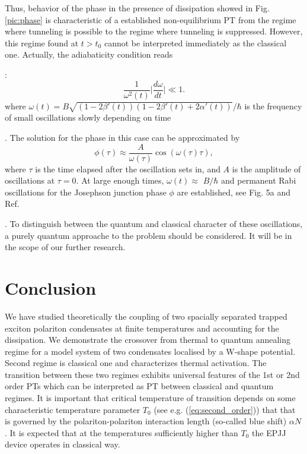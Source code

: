 \documentclass[aps, pre, preprint, groupedaddress, superscriptaddress, showkeys, showpacs] {revtex4-1}
\begin{document}
Thus, behavior of the phase in the presence of dissipation showed in Fig. \ref{pic:phase} is characteristic of a established non-equilibrium PT from the regime where tunneling is possible to the regime where tunneling is suppressed.
However, this regime found at $t>t_0$ cannot be interpreted immediately as the classical one.
Actually, the adiabaticity condition reads {\cite{Sols}:
%
\begin{equation}
\dfrac{1}{\omega^2(t)} \Big| \dfrac{d \omega}{d t} \Big| \ll 1.
\end{equation}
%
where $\omega(t) = B \sqrt{(1 - 2 \beta'(t))(1 - 2 \beta'(t) + 2 \alpha'(t))}/ \hbar $ is the frequency of small oscillations slowly depending on time {\cite{Sedov}. 
The solution for the phase in this case can be approximated by 
\begin{equation}
\phi(\tau) \approx \dfrac{A}{\omega(\tau)} \cos (\omega(\tau) \tau),
\end{equation}
%
where $\tau$ is the time elapsed after the oscillation sets in, and $A$ is the amplitude of oscillations at $\tau = 0$.
At large enough times, $\omega(t) \approx$ $B/ \hbar$ and permanent Rabi  oscillations for the Josephson junction phase $\phi$ are established, see Fig. 5a and Ref. {\cite{Permamemt}.
To distinguish between the quantum and classical character of these oscillations, a purely quantum approache to the problem should be considered.      
It will be in the scope of our further research.

\section{Conclusion \label{sec:conclusion}}

We have studied theoretically the coupling of two spacially separated trapped exciton polariton condensates at finite temperatures and accounting for the dissipation.
We demonstrate the crossover from thermal to quantum annealing regime for a model system of two condensates localised by a W-shape potential.
Second regime is classical one and characterizes  thermal activation.
The transition between these two regimes exhibits universal features of the 1st or 2nd order PTs which can be interpreted as PT between classical and quantum regimes. It is important that critical temperature of transition depends on some  characteristic temperature  parameter $T_{0}$ (see e.g. (\ref{eq:second_order})) that that is governed by the polariton-polariton interaction length (so-called blue shift) $\alpha N$.  It is expected that  at the temperatures sufficiently higher than  $T_{0}$ the EPJJ device operates in classical way. 

}}}
\end{document}
